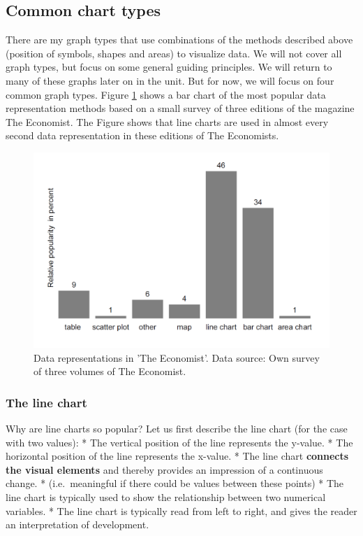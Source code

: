 \documentclass[]{book}
\begin{document}
\hypertarget{common-chart-types}{%
\subsection{Common chart types}\label{common-chart-types}}

There are my graph types that use combinations of the methods described above (position of symbols, shapes and areas) to visualize data. We will not cover all graph types, but focus on some general guiding principles. We will return to many of these graphs later on in the unit. But for now, we will focus on four common graph types. Figure \ref{fig:viz9} shows a bar chart of the most popular data representation methods based on a small survey of three editions of the magazine The Economist. The Figure shows that line charts are used in almost every second data representation in these editions of The Economists.

\begin{figure}

{\centering \includegraphics[width=0.48\linewidth]{_resources/chapter_viz/econhist} 

}

\caption{Data representations in 'The Economist'. Data source: Own survey  of three volumes of The Economist.}\label{fig:viz9}
\end{figure}

\hypertarget{the-line-chart}{%
\subsubsection{The line chart}\label{the-line-chart}}

Why are line charts so popular? Let us first describe the line chart (for the case with two values):
* The vertical position of the line represents the y-value.
* The horizontal position of the line represents the x-value.
* The line chart \textbf{connects the visual elements} and thereby provides an impression of a continuous change.
* (i.e.~meaningful if there could be values between these points)
* The line chart is typically used to show the relationship between two numerical variables.
* The line chart is typically read from left to right, and gives the reader an interpretation of development.
\end{document}
